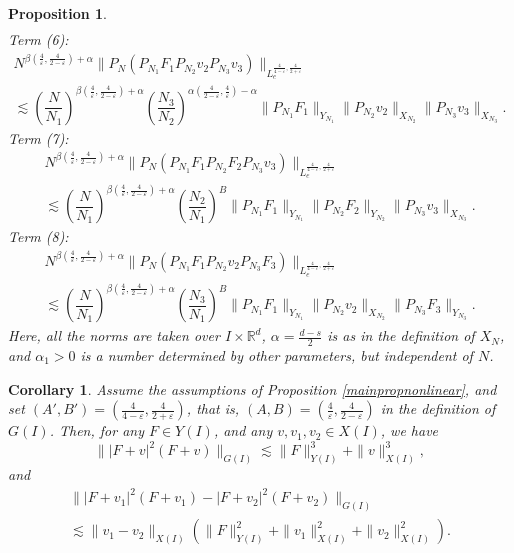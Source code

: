 \documentclass[10pt,leqno]{amsart}
\newtheorem{prop}[thm]{Proposition} %
\newtheorem{cor}[thm]{Corollary} %
\newcommand{\R}{\mathbb{R}} %
\numberwithin{equation}{section}
\begin{document}
\begin{prop}
\begin{multline*}
\end{multline*}
\noindent
Term (6):
\begin{multline*}
N^{\beta (\frac{4}{\varepsilon},\frac{4}{2-\varepsilon}) +\alpha} \|P_N (P_{N_1} F_1 P_{N_2} v_2 P_{N_3} v_3) \|_{L_e^{\frac{4}{4-\varepsilon} , \frac{4}{2+\varepsilon}} }\\
 \lesssim \left(\dfrac{N}{N_1}\right)^{\beta (\frac{4}{\varepsilon},\frac{4}{2-\varepsilon})+\alpha} \left(\dfrac{N_3}{N_2}\right)^{\alpha  (\frac{4}{2-\varepsilon},\frac{4}{\varepsilon}) -\alpha} \|P_{N_1}F_1\|_{Y_{N_1}}\|P_{N_2}v_2\|_{X_{N_2}} \|P_{N_3}v_3\|_{X_{N_3}}.  
\end{multline*}
\noindent
Term (7):
\begin{multline*}
N^{\beta (\frac{4}{\varepsilon},\frac{4}{2-\varepsilon}) +\alpha} \|P_N (P_{N_1} F_1 P_{N_2} F_2 P_{N_3} v_3) \|_{L_e^{\frac{4}{4-\varepsilon} , \frac{4}{2+\varepsilon}} }\\
 \lesssim \left(\dfrac{N}{N_1}\right)^{\beta  (\frac{4}{\varepsilon},\frac{4}{2-\varepsilon})+\alpha} \left(\dfrac{N_2}{N_1}\right)^{B} \|P_{N_1}F_1\|_{Y_{N_1}}\|P_{N_2}F_2\|_{Y_{N_2}} \|P_{N_3}v_3\|_{X_{N_3}}.  
\end{multline*}
\noindent
Term (8):
\begin{multline*}
N^{\beta (\frac{4}{\varepsilon},\frac{4}{2-\varepsilon}) +\alpha} \|P_N (P_{N_1} F_1 P_{N_2} v_2 P_{N_3} F_3) \|_{L_e^{\frac{4}{4-\varepsilon} , \frac{4}{2+\varepsilon}} }\\
 \lesssim \left(\dfrac{N}{N_1}\right)^{\beta  (\frac{4}{\varepsilon},\frac{4}{2-\varepsilon})+\alpha} \left(\dfrac{N_3}{N_1}\right)^{B} \|P_{N_1}F_1\|_{Y_{N_1}}\|P_{N_2}v_2\|_{X_{N_2}} \|P_{N_3}F_3\|_{Y_{N_3}}.  
\end{multline*}
Here, all the norms are taken over $I\times \R^d$, $\alpha = \frac{d-s}{2}$ is as in the definition of $X_N$, and $\alpha_1>0$
is a number determined by other parameters, but independent of $N$. 
\end{prop}

\begin{cor}\label{cor:wis}
Assume the assumptions of Proposition \ref{mainpropnonlinear}, and set $(A', B') = (\frac{4}{4 - \varepsilon}, \frac{4}{2 + \varepsilon})$, that is, $(A, B) = (\frac{4}{\varepsilon}, \frac{4}{2 - \varepsilon})$ 
in the definition of $G(I)$. Then, 
for any $F\in Y(I)$, and any $v,v_1,v_2\in X(I)$, we have
$$\||F+v|^2 (F+v)\|_{G(I)}\lesssim \|F\|_{Y(I)}^3 +\|v\|_{X(I)}^3,$$
and
\begin{multline*}
\||F+v_1|^2 (F+v_1) - |F+v_2|^2 (F+v_2) \|_{G(I)} \\
\lesssim \|v_1 - v_2\|_{X(I)} (\|F\|^2_{Y(I)} +\|v_1\|_{X(I)}^2 +\|v_2\|_{X(I)}^2).
\end{multline*}
\end{cor}
\end{document}
